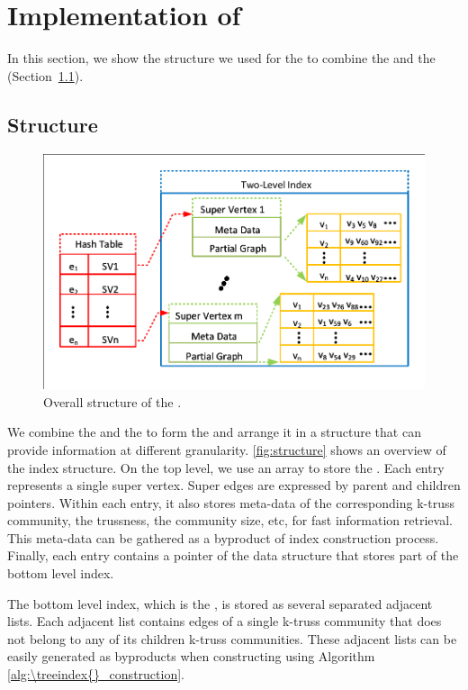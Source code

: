 \section{Implementation of \TwoLevelIndex{}}
\label{implementation}

In this section, we show the structure we used for the \twolevelindex{} to combine the \inducedgraph{} and the \treeindex{} (Section~\ref{structure}).

\subsection{\TwoLevelIndex Structure}
\label{structure}

\begin{figure}[ht]
    \centering
    \includegraphics[width=0.8\linewidth, trim={0.1cm 0.1cm, 0.1cm, 0.1cm}, clip]{./figures/structure.pdf}
    \caption{Overall structure of the \twolevelindex{}.}
    \label{fig:structure}
\end{figure}

We combine the \inducedgraph{} and the \treeindex{} to form the \twolevelindex{} and arrange it in a structure that can provide information at different granularity. \autoref{fig:structure} shows an overview of the index structure. On the top level, we use an array to store the \treeindex{}. Each entry represents a single super vertex. Super edges are expressed by parent and children pointers. Within each entry, it also stores meta-data of the corresponding k-truss community, \eg the trussness, the community size, etc, for fast information retrieval. This meta-data can be gathered as a byproduct of index construction process. Finally, each entry contains a pointer of the data structure that stores part of the bottom level index. 

The bottom level index, which is the \inducedgraph{}, is stored as several separated adjacent lists. Each adjacent list contains edges of a single k-truss community that does not belong to any of its children k-truss communities. These adjacent lists can be easily generated as byproducts when constructing \treeindex{} using Algorithm \ref{alg:\treeindex{}_construction}.%

